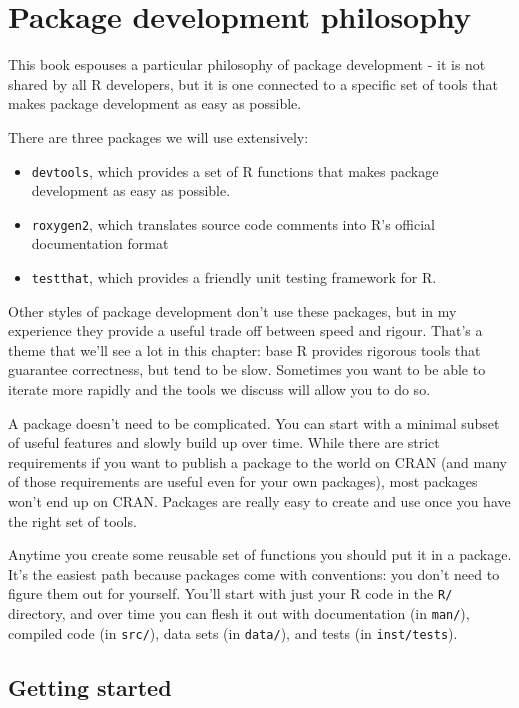 \chapter{Package development philosophy}

This book espouses a particular philosophy of package development - it
is not shared by all R developers, but it is one connected to a specific
set of tools that makes package development as easy as possible.

There are three packages we will use extensively:

\begin{itemize}
\item
  \texttt{devtools}, which provides a set of R functions that makes
  package development as easy as possible.
\item
  \texttt{roxygen2}, which translates source code comments into R's
  official documentation format
\item
  \texttt{testthat}, which provides a friendly unit testing framework
  for R.
\end{itemize}

Other styles of package development don't use these packages, but in my
experience they provide a useful trade off between speed and rigour.
That's a theme that we'll see a lot in this chapter: base R provides
rigorous tools that guarantee correctness, but tend to be slow.
Sometimes you want to be able to iterate more rapidly and the tools we
discuss will allow you to do so.

A package doesn't need to be complicated. You can start with a minimal
subset of useful features and slowly build up over time. While there are
strict requirements if you want to publish a package to the world on
CRAN (and many of those requirements are useful even for your own
packages), most packages won't end up on CRAN. Packages are really easy
to create and use once you have the right set of tools.

Anytime you create some reusable set of functions you should put it in a
package. It's the easiest path because packages come with conventions:
you don't need to figure them out for yourself. You'll start with just
your R code in the \texttt{R/} directory, and over time you can flesh it
out with documentation (in \texttt{man/}), compiled code (in
\texttt{src/}), data sets (in \texttt{data/}), and tests (in
\texttt{inst/tests}).

\section{Getting started}


